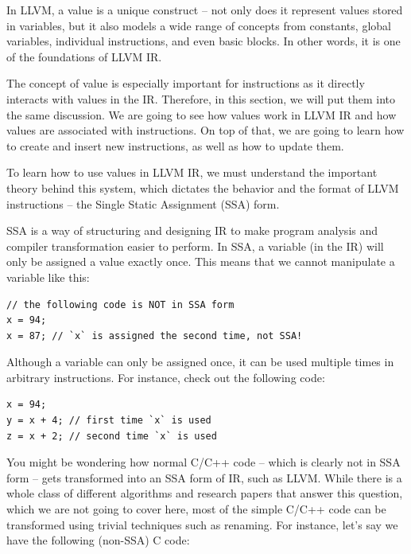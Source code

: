 
In LLVM, a value is a unique construct – not only does it represent values stored in variables, but it also models a wide range of concepts from constants, global variables, individual instructions, and even basic blocks. In other words, it is one of the foundations of LLVM IR.

The concept of value is especially important for instructions as it directly interacts with values in the IR. Therefore, in this section, we will put them into the same  discussion. We are going to see how values work in LLVM IR and how values are associated with instructions. On top of that, we are going to learn how to create and insert new instructions, as well as how to update them.

To learn how to use values in LLVM IR, we must understand the important theory behind this system, which dictates the behavior and the format of LLVM instructions – the Single Static Assignment (SSA) form.


SSA is a way of structuring and designing IR to make program analysis and compiler transformation easier to perform. In SSA, a variable (in the IR) will only be assigned a value exactly once. This means that we cannot manipulate a variable like this:

\begin{lstlisting}[style=styleCXX]
// the following code is NOT in SSA form
x = 94;
x = 87; // `x` is assigned the second time, not SSA!
\end{lstlisting}

Although a variable can only be assigned once, it can be used multiple times in arbitrary instructions. For instance, check out the following code:

\begin{lstlisting}[style=styleCXX]
x = 94;
y = x + 4; // first time `x` is used
z = x + 2; // second time `x` is used
\end{lstlisting}

You might be wondering how normal C/C++ code – which is clearly not in SSA form – gets transformed into an SSA form of IR, such as LLVM. While there is a whole class of different algorithms and research papers that answer this question, which we are not going to cover here, most of the simple C/C++ code can be transformed using trivial techniques such as renaming. For instance, let's say we have the following (non-SSA) C code:

